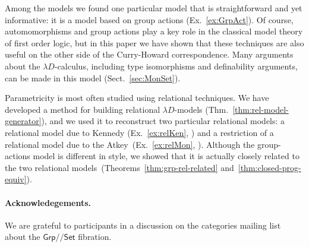 \documentclass[a4paper,UKenglish]{lipics}
\newcommand{\msf}[1]{\mathsf{#1}} %
\newcommand{\Grp}{\msf{Grp}}
\newcommand{\Set}{\msf{Set}}
\newcommand{\Lslice}[1]{#1/\!/\Set}
\newcommand{\GrpSet}{\Lslice{\Grp}}
\begin{document}
Among the models we found one particular model that is
straightforward and yet informative:
it is a model based on group actions (Ex.~\ref{ex:GrpAct}).
Of course, automomorphisms and group actions play a key role in the
classical model theory of first order logic, but in this paper we have shown that
these techniques are also useful on the other side of the Curry-Howard correspondence.
Many arguments about the $\lambda D$-calculus,
including type isomorphisms and definability arguments, can be made in this model
(Sect.~\ref{sec:MonSet}).

Parametricity is most often studied using relational techniques.
We have developed a method for building relational $\lambda D$-models (Thm.~\ref{thm:rel-model-generator}),
and we used it to reconstruct two particular relational models:
a relational
model due to Kennedy (Ex.~\ref{ex:relKen}, \cite{Kennedy:1997:RPU:263699.263761}) and
a restriction of
a relational
model due to the Atkey~(Ex.~\ref{ex:relMon}, \cite{atkey14conservation}).
Although the group-actions model is different in style,
we showed that it is actually closely related to the
two relational models~(Theorems~\ref{thm:grp-rel-related} and~\ref{thm:closed-prog-equiv}).


\paragraph*{Acknowledegements.}
We are grateful to participants in a discussion on the categories mailing list
about the $\GrpSet$ fibration.
\end{document}
